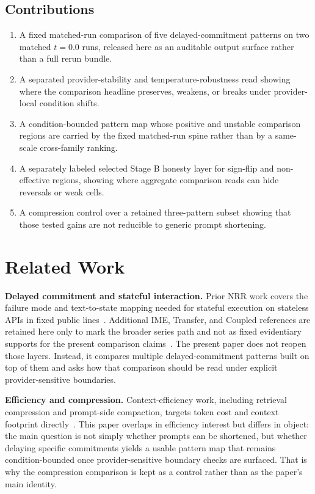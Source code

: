 \documentclass[11pt,a4paper]{article}
\begin{document}
\subsection{Contributions}

\begin{enumerate}
  \item A fixed matched-run comparison of five delayed-commitment patterns on two matched \(t=0.0\) runs, released here as an auditable output surface rather than a full rerun bundle.
  \item A separated provider-stability and temperature-robustness read showing where the comparison headline preserves, weakens, or breaks under provider-local condition shifts.
  \item A condition-bounded pattern map whose positive and unstable comparison regions are carried by the fixed matched-run spine rather than by a same-scale cross-family ranking.
  \item A separately labeled selected Stage B honesty layer for sign-flip and non-effective regions, showing where aggregate comparison reads can hide reversals or weak cells.
  \item A compression control over a retained three-pattern subset showing that those tested gains are not reducible to generic prompt shortening.
\end{enumerate}

\section{Related Work}
\label{sec:related}

\textbf{Delayed commitment and stateful interaction.}
Prior NRR work covers the failure mode and text-to-state mapping needed for stateful execution on stateless APIs in fixed public lines~\cite{saito2025nrr,saito2026phi}. Additional IME, Transfer, and Coupled references are retained here only to mark the broader series path and not as fixed evidentiary supports for the present comparison claims~\cite{saito2026ime,saito2026transfer,saito2026coupled}. The present paper does not reopen those layers. Instead, it compares multiple delayed-commitment patterns built on top of them and asks how that comparison should be read under explicit provider-sensitive boundaries.

\textbf{Efficiency and compression.}
Context-efficiency work, including retrieval compression and prompt-side compaction, targets token cost and context footprint directly~\cite{xu2023recomp,chevalier2023compress}. This paper overlaps in efficiency interest but differs in object: the main question is not simply whether prompts can be shortened, but whether delaying specific commitments yields a usable pattern map that remains condition-bounded once provider-sensitive boundary checks are surfaced. That is why the compression comparison is kept as a control rather than as the paper's main identity.
\end{document}
